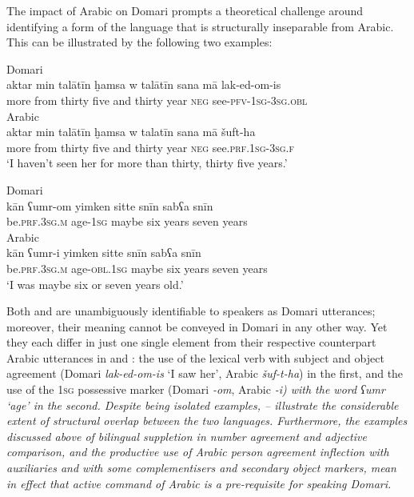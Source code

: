 \documentclass[output=paper]{langsci/langscibook}
\begin{document}
The impact of Arabic on Domari prompts a theoretical challenge around identifying a form of the language that is structurally inseparable from Arabic. This can be illustrated by the following two examples:

\ea \label{aktar1}
\ea
{Domari}\\
\gll aktar min talātīn ḫamsa w talātīn sana mā lak-ed-om-is\\
     more from thirty five and thirty year \textsc{neg} see-\textsc{pfv-1sg-3sg.obl}\\ \label{aktar}
\ex
{Arabic}\\
\gll aktar min talātīn ḫamsa w talatīn sana mā šuft-ha\\
     more from thirty five and thirty year \textsc{neg} see.\textsc{prf.1sg-3sg.f}\\ \label{aktar2}
\glt ‘I haven’t seen her for more than thirty, thirty five years.’
\z
\z

\ea \label{umr1}
\ea
{Domari}\\
\gll kān ʕumr-om yimken sitte snīn sabʕa snīn\\
     be\textsc{.prf.3sg.m} age-\textsc{1sg} maybe six years seven years\\ \label{umr}
\ex
{Arabic}\\
\gll kān ʕumr-i yimken sitte snīn sabʕa snīn\\
     be\textsc{.prf.3sg.m} age-\textsc{obl.1sg} maybe six years seven years\\ \label{umr2}
\glt ‘I was maybe six or seven years old.’
\z
\z

Both  and  are unambiguously identifiable to speakers as Domari utterances; moreover, their meaning cannot be conveyed in Domari in any other way. Yet they each differ in just one single element from their respective counterpart Arabic utterances in  and : the use of the lexical verb with subject and object agreement (Domari \textit{lak-ed-om-is} ‘I saw her’, Arabic \textit{šuf-t-ha}) in the first, and the use of the \textsc{1sg} possessive marker (Domari \-\textit{{}-om}, Arabic \textit{-i\textup{) with the word} ʕumr \textup{‘age’ in the second. Despite being isolated examples, – illustrate the considerable extent of structural overlap between the two languages. Furthermore, the examples discussed above of bilingual suppletion in number agreement and adjective comparison, and the productive use of Arabic person agreement inflection with auxiliaries and with some complementisers and secondary object markers, mean in effect that active command of Arabic is a pre-requisite for speaking Domari.}}
\end{document}
